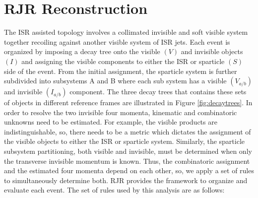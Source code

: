 \section{ RJR Reconstruction}
 The ISR assisted topology involves a collimated invisible and soft visible system together recoiling against another visible system of ISR jets. Each event is organized by imposing a decay tree onto the visible $(V)$ and invisible objects $(I)$ and assigning the visible components to either the ISR or sparticle $(S)$ side of the event. From the initial assignment, the sparticle system is further subdivided into subsystems A and B where each sub system has a visible $(V_{a/b})$ and invisible  $(I_{a/b})$ component. The three decay trees that contains these sets of objects in different reference frames are illustrated in Figure \ref{fig:decaytrees}. 
In order to resolve the two invisible four momenta, kinematic and combinatoric unknowns need to be estimated. For example, the visible products are indistinguishable, so, there needs to be a metric which dictates the assignment of the visible objects to either the ISR or sparticle system. Similarly, the sparticle subsystem partitioning, both visible and invisible, must be determined when only the transverse invisible momentum is known. Thus, the combinatoric assignment and the estimated four momenta depend on each other, so, we  apply a set of rules to simultaneously determine both.  RJR provides the framework to organize and evaluate each event. The set of rules used by this analysis are as follows:
